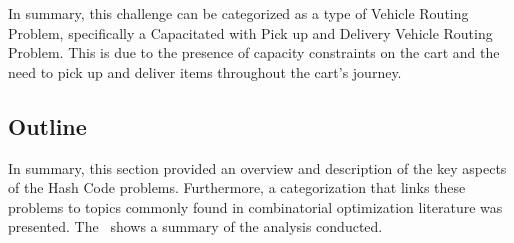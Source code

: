 In summary, this challenge can be categorized as a type of Vehicle Routing
Problem, specifically a Capacitated with Pick up and Delivery Vehicle Routing
Problem. This is due to the presence of capacity constraints on the cart and the
need to pick up and deliver items throughout the cart's journey.

\subsection{Outline}
\label{subsec:hashcode-outline}

In summary, this section provided an overview and description of the key aspects
of the Hash Code problems. Furthermore, a categorization that links these
problems to topics commonly found in combinatorial optimization literature was
presented. The~ shows a summary of the
analysis conducted.

